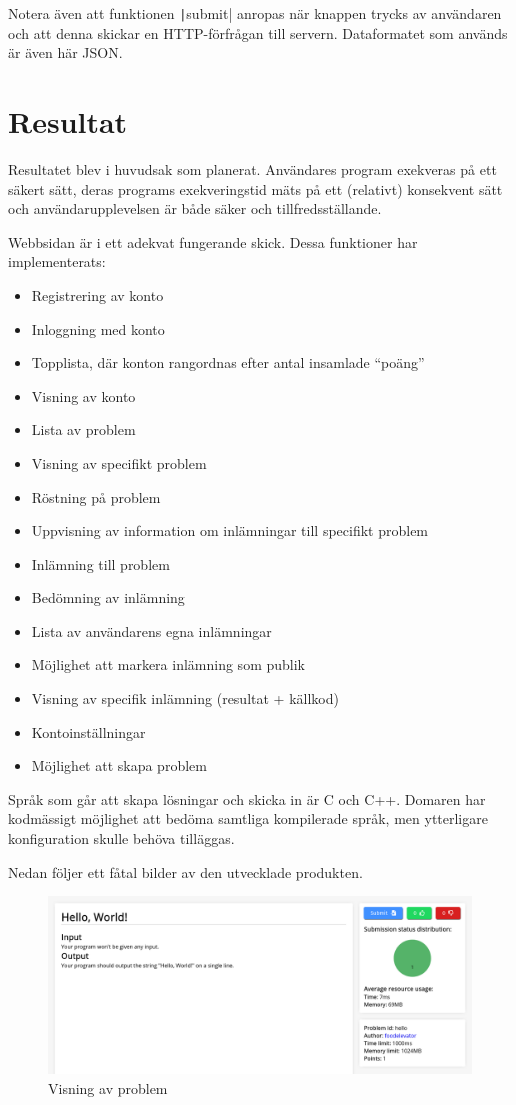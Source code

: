 \documentclass{article}
\begin{document}
Notera även att funktionen \texttt|submit| anropas när
knappen trycks av användaren och att denna skickar en HTTP-förfrågan till
servern. Dataformatet som används är även här JSON.

\section{Resultat}

Resultatet blev i huvudsak som planerat. Användares program exekveras på ett
säkert sätt, deras programs exekveringstid mäts på ett (relativt) konsekvent
sätt och användarupplevelsen är både säker och tillfredsställande.

Webbsidan är i ett adekvat fungerande skick. Dessa funktioner har
implementerats:

\begin{itemize}
	\item Registrering av konto
	\item Inloggning med konto
	\item Topplista, där konton rangordnas efter antal insamlade ``poäng''
	\item Visning av konto
	\item Lista av problem
	\item Visning av specifikt problem
	\item Röstning på problem
	\item Uppvisning av information om inlämningar till specifikt problem
	\item Inlämning till problem
	\item Bedömning av inlämning
	\item Lista av användarens egna inlämningar
	\item Möjlighet att markera inlämning som publik
	\item Visning av specifik inlämning (resultat + källkod)
	\item Kontoinställningar
	\item Möjlighet att skapa problem
\end{itemize}

Språk som går att skapa lösningar och skicka in är C och C++. Domaren har
kodmässigt möjlighet att bedöma samtliga kompilerade språk, men ytterligare
konfiguration skulle behöva tilläggas.

Nedan följer ett fåtal bilder av den utvecklade produkten.

\begin{figure}[H]
	\centering
	\includegraphics[width=1\textwidth]{problem}
	\caption{Visning av problem}
\end{figure}
\end{document}
